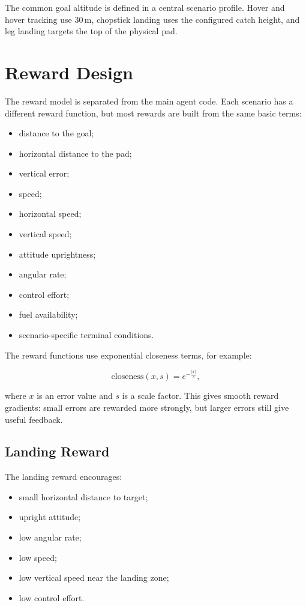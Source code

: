 \documentclass[12pt,a4paper]{article}
\begin{document}
The common goal altitude is defined in a central scenario profile. Hover and hover tracking use \(30\,\mathrm{m}\), chopstick landing uses the configured catch height, and leg landing targets the top of the physical pad.

\section{Reward Design}

The reward model is separated from the main agent code. Each scenario has a different reward function, but most rewards are built from the same basic terms:

\begin{itemize}
    \item distance to the goal;
    \item horizontal distance to the pad;
    \item vertical error;
    \item speed;
    \item horizontal speed;
    \item vertical speed;
    \item attitude uprightness;
    \item angular rate;
    \item control effort;
    \item fuel availability;
    \item scenario-specific terminal conditions.
\end{itemize}

The reward functions use exponential closeness terms, for example:

\begin{equation}
\mathrm{closeness}(x, s) = e^{-\frac{|x|}{s}},
\end{equation}

where \(x\) is an error value and \(s\) is a scale factor. This gives smooth reward gradients: small errors are rewarded more strongly, but larger errors still give useful feedback.

\subsection{Landing Reward}

The landing reward encourages:

\begin{itemize}
    \item small horizontal distance to target;
    \item upright attitude;
    \item low angular rate;
    \item low speed;
    \item low vertical speed near the landing zone;
    \item low control effort.
\end{itemize}
\end{document}
